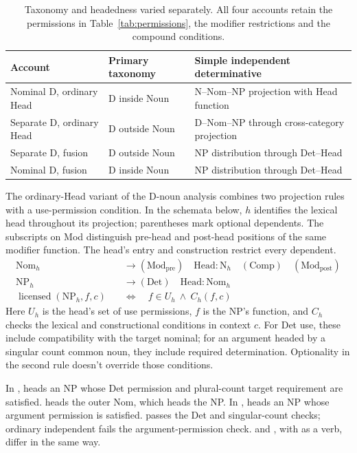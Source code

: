 \documentclass[12pt]{article}
\begin{document}
\begin{table}[H]
\centering\small
\caption{Taxonomy and headedness varied separately. All four accounts retain the permissions in Table~\ref{tab:permissions}, the modifier restrictions and the compound conditions.}\label{tab:economy}
\begin{tabular}{>{\raggedright\arraybackslash}p{3.1cm}>{\raggedright\arraybackslash}p{3.9cm}>{\raggedright\arraybackslash}p{4.7cm}}
\toprule
Account & Primary taxonomy & Simple independent determinative \\
\midrule
Nominal D, ordinary Head & D inside Noun & N--Nom--NP projection with Head function \\
Separate D, ordinary Head & D outside Noun & D--Nom--NP through cross-category projection \\
Separate D, fusion & D outside Noun & NP distribution through Det--Head \\
Nominal D, fusion & D inside Noun & NP distribution through Det--Head \\
\bottomrule
\end{tabular}
\end{table}

The ordinary-Head variant of the D-noun analysis combines two projection rules with a use-permission condition. In the schemata below, $h$ identifies the lexical head throughout its projection; parentheses mark optional dependents. The subscripts on Mod distinguish pre-head and post-head positions of the same modifier function. The head's entry and construction restrict every dependent.
\[
\begin{aligned}
\mathrm{Nom}_{h} &\to (\mathrm{Mod}_{\mathrm{pre}})\quad \mathrm{Head}:\mathrm{N}_{h}\quad (\mathrm{Comp})\quad (\mathrm{Mod}_{\mathrm{post}}) \\
\mathrm{NP}_{h} &\to (\mathrm{Det})\quad \mathrm{Head}:\mathrm{Nom}_{h} \\
\operatorname{licensed}(\mathrm{NP}_{h},f,c)\quad &\Longleftrightarrow\quad f\in U_h\ \land\ C_h(f,c)
\end{aligned}
\]
Here $U_h$ is the head's set of use permissions, $f$ is the NP's function, and $C_h$ checks the lexical and constructional conditions in context $c$. For Det use, these include compatibility with the target nominal; for an argument headed by a singular count common noun, they include required determination. Optionality in the second rule doesn't override those conditions.

In ,  heads an NP whose Det permission and plural-count target requirement are satisfied.  heads the outer Nom, which heads the NP. In ,  heads an NP whose argument permission is satisfied.  passes the Det and singular-count checks; ordinary independent  fails the argument-permission check.  and , with  as a verb, differ in the same way.
\end{document}
